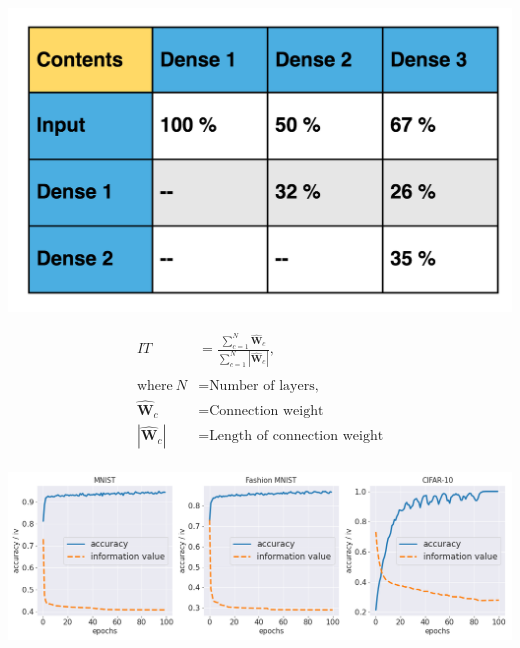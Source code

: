 \documentclass{article}
\let\oldhat\hat
\renewcommand{\hat}[1]{\oldhat{\mathbf{#1}}}
\begin{document}
\begin{minipage}{.45\textwidth}
    \centering
    \includegraphics[scale=0.13]{SampleTable.png}
    \label{fig:DSC.png}
\end{minipage}
\begin{minipage}{.45\textwidth}
    \begin{equation}
    \begin{aligned}
    IT &=\frac{\sum_{c=1}^{N}\hat{W}_{c}}{\sum_{c=1}^{N}|\hat{W}_{c}|}, \\
    \\
    \text{where}~N &= \text{Number of layers,} \\
    \hat{W}_{c} &= \text{Connection weight}\\
    |\hat{W}_{c}| &= \text{Length of connection weight}\\
\end{aligned}
\end{equation}
\end{minipage}


\begin{minipage}{.4\textwidth}
    \lipsum[6]
\end{minipage}
\begin{minipage}{.5\textwidth}
    \centering
    \includegraphics[scale=0.25]{paper/iv.png}
    \label{fig:iv.png}
\end{minipage}
\end{document}
